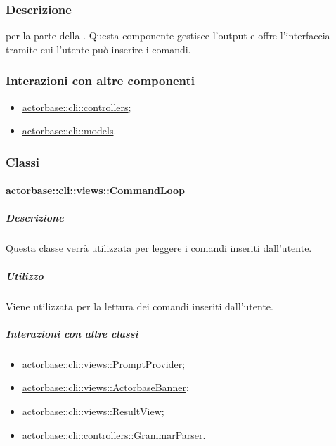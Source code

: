 \documentclass{scalatekids-article}
\begin{document}
\subsubsection{Descrizione}

 per la parte  della . Questa componente
gestisce l'output e offre l'interfaccia tramite cui l'utente può inserire i
comandi.

\subsubsection{Interazioni con altre componenti}

\begin{itemize}
\item \hyperref[sec:actorbase::cli::controllers]{actorbase::cli::controllers};
\item \hyperref[sec:actorbase::cli::models]{actorbase::cli::models}.
\end{itemize}

\subsubsection{Classi}

\paragraph{actorbase::cli::views::CommandLoop}
\label{sec:actorbase::cli::views::CommandLoop}

\subparagraph{Descrizione}

Questa classe verrà utilizzata per leggere i comandi inseriti dall'utente.

\subparagraph{Utilizzo}

Viene utilizzata per la lettura dei comandi inseriti dall'utente.

\subparagraph{Interazioni con altre classi}

\begin{itemize}
\item \hyperref[sec:actorbase::cli::views::PromptProvider]{actorbase::cli::views::PromptProvider};
\item \hyperref[sec:actorbase::cli::views::ActorbaseBanner]{actorbase::cli::views::ActorbaseBanner};
\item \hyperref[sec:actorbase::cli::views::ResultView]{actorbase::cli::views::ResultView};
\item \hyperref[sec:actorbase::cli::controllers::GrammarParser]{actorbase::cli::controllers::GrammarParser}.
\end{itemize}
\end{document}
